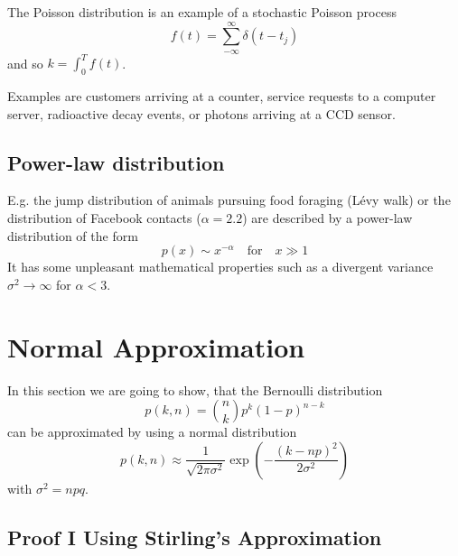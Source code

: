 \documentclass{notebook}
\begin{document}
\begin{remark}
	The Poisson distribution is an example of a stochastic Poisson process 
	\begin{equation}
	f(t) = \sum^{\infty}_{-\infty}{\delta(t - t_j)}
	\end{equation}
	and so $k = \int^T_0{f(t)} $.	
\end{remark}

Examples are customers arriving at a counter, service requests to a computer server, radioactive decay events, or photons arriving at a CCD sensor. 

\subsection*{Power-law distribution}

E.g. the jump distribution of animals pursuing food foraging (L\'evy walk) or the distribution of Facebook contacts ($\alpha = 2.2$) are described by a power-law distribution of the form
%
\begin{equation}
p(x) \sim x^{- \alpha} \quad \mathrm{for} \quad x \gg 1
\end{equation}
%
It has some unpleasant mathematical properties such as a divergent variance $\sigma^2 \to \infty $ for $\alpha < 3$.


\section{Normal Approximation}

In this section we are going to show, that the Bernoulli distribution 
%
\begin{equation}
p(k,n) = \binom{n}{k} p^k (1 - p)^{n - k}
\end{equation}
%
can be approximated by using a normal distribution
%
\begin{equation}
p(k,n) \approx \frac{1}{\sqrt{2 \pi \sigma^2}} \exp(-\frac{(k-np)^2}{2 \sigma^2})
\end{equation}
%
with $\sigma^2 = npq$.

\subsection*{Proof I Using Stirling's Approximation}
\end{document}

